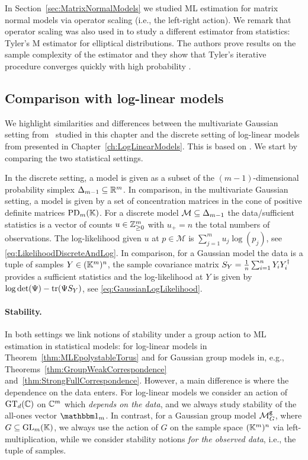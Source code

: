 In Section~\ref{sec:MatrixNormalModels} we studied ML estimation for matrix normal models via operator scaling (i.e., the left-right action). We remark that operator scaling was also used in \cite{franks2020rigorous} to study a different estimator from statistics: Tyler's M estimator for elliptical distributions. The authors prove results on the sample complexity \cite[Theorems~1.1 and~1.2]{franks2020rigorous} of the estimator and they show that Tyler's iterative procedure converges quickly with high probability \cite[Theorem~1.3]{franks2020rigorous}.






\subsection*{Comparison with log-linear models}

We highlight similarities and differences between the multivariate Gaussian setting from~\cite{SiagaPaper} studied in this chapter and the discrete setting of log-linear models from \cite{DiscretePaper} presented in Chapter~\ref{ch:LogLinearModels}. This is based on \cite[Section~6]{DiscretePaper}.
We start by comparing the two statistical settings.

In the discrete setting, a model is given as a subset of the $(m-1)$-dimensional probability simplex $\Delta_{m-1} \subseteq \mathbb R^m$. In comparison, in the multivariate Gaussian setting, a model is given by a set of concentration matrices in the cone of positive definite matrices $\operatorname{PD}_m(\mathbb K)$.
For a discrete model $\mathcal{M} \subseteq \Delta_{m-1}$ the data/sufficient statistics is a vector of counts $u \in \mathbb Z^m_{\geq 0}$ with $u_+ = n$ the total numbers of observations. The log-likelihood given $u$ at $p \in \mathcal{M}$ is $\sum_{j=1}^m u_j \log(p_j)$, see \eqref{eq:LikelihoodDiscreteAndLog}. In comparison, for a Gaussian model the data is a tuple of samples $Y \in (\mathbb K^m)^n$, the sample covariance matrix $S_Y = \frac{1}{n} \sum_{i=1}^n Y_i Y_i^{\dagger}$ provides a sufficient statistics and the log-likelihood at $Y$ is given by
$\log \det (\Psi) - \operatorname{tr} (\Psi S_Y)$, see \eqref{eq:GaussianLogLikelihood}.

\paragraph{Stability.}
In both settings we link notions of stability under a group action to ML estimation in statistical models: for log-linear models in Theorem~\ref{thm:MLEpolystableTorus} and for Gaussian group models in, e.g., Theorems~\ref{thm:GroupWeakCorrespondence} and~\ref{thm:StrongFullCorrespondence}. However, a main difference is where the dependence on the data enters. For log-linear models we consider an action of $\operatorname{GT}_d(\mathbb C)$ on $\mathbb C^m$ which \emph{depends on the data}, and we always study stability of the all-ones vector $\ones_m$. In contrast, for a Gaussian group model $\mathcal{M}^{\mathtt{g}}_G$, where $G \subseteq \operatorname{GL}_m(\mathbb K)$, we always use the action of $G$ on the sample space $(\mathbb K^m)^n$ via left-multiplication, while we consider stability notions \emph{for the observed data}, i.e., the tuple of samples.

